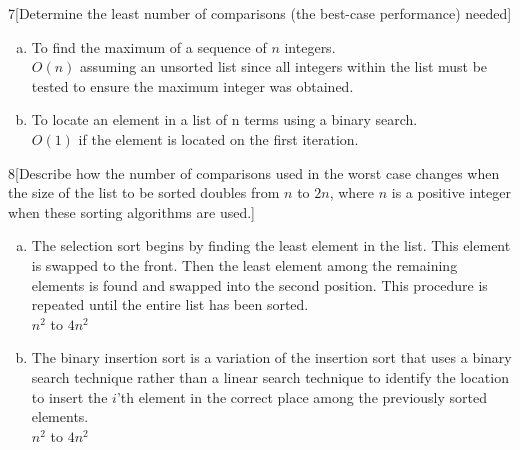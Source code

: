 \documentclass{homework}
\begin{document}

\begin{problem}{7}[Determine the least number of comparisons (the best-case performance) needed]

\begin{enumerate}[(a)]
\item To find the maximum of a sequence of $n$ integers. \\
$O(n)$ assuming an unsorted list since all integers within the list must be tested to ensure the maximum integer was obtained.

\item To locate an element in a list of n terms using a binary search. \\
$O(1)$ if the element is located on the first iteration.
\end{enumerate}
\end{problem}



\begin{problem}{8}[Describe how the number of comparisons used in the worst case changes when the size of the list to be sorted
doubles from $n$ to $2n$, where $n$ is a positive integer when these sorting algorithms are used.]

\begin{enumerate}[(a)]
\item The selection sort begins by finding the least element in the list. This element is swapped to the front. Then the least
element among the remaining elements is found and swapped into the second position. This procedure is repeated
until the entire list has been sorted.\\
$n^2$ to $4n^2$

\item The binary insertion sort is a variation of the insertion sort that uses a binary search technique rather than a linear
search technique to identify the location to insert the $i$'th element in the correct place among the previously sorted
elements. \\
$n^2$ to $4n^2$
\end{enumerate}

\end{problem}
\end{document}
